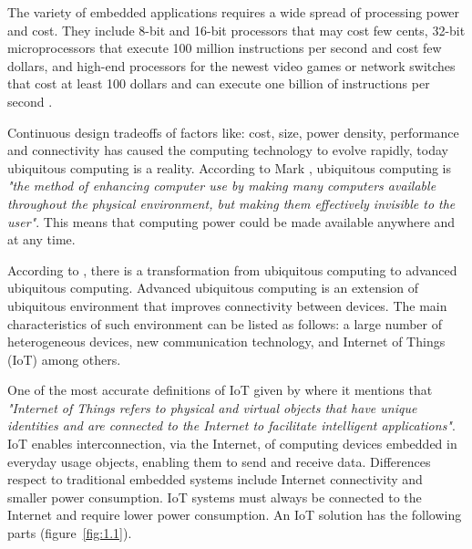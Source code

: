 The variety of embedded applications requires a wide spread of processing power
and cost. They include 8-bit and 16-bit processors that may cost few cents,
32-bit microprocessors that execute 100 million instructions per second and
cost few dollars, and high-end processors for the newest video games
or network switches that cost at least 100 dollars and can execute one billion
of instructions per second \cite{Hennessy}.

Continuous design tradeoffs of factors like: cost, size, power density,
performance and connectivity has caused the computing technology to evolve
rapidly, today ubiquitous computing is a reality. According to Mark
\cite{Mark}, ubiquitous computing is \textit{"the method of enhancing computer
use by making many computers available throughout the physical environment, but
making them effectively invisible to the user"}. This means that computing
power could be made available anywhere and at any time. 


According to \cite{Nur}, there is a transformation from ubiquitous computing to
advanced ubiquitous computing. Advanced ubiquitous computing is an extension of
ubiquitous environment that improves connectivity between devices. The main
characteristics of such environment can be listed as follows: a large number of
heterogeneous devices, new communication technology, and Internet of Things
(IoT) among others.

One of the most accurate definitions of IoT given by \cite{Bahga} where it
mentions that \textit{"Internet of Things refers to physical and virtual
objects that have unique identities and are connected to the Internet to
facilitate intelligent applications"}. IoT enables interconnection, via the
Internet, of computing devices embedded in everyday usage objects, enabling
them to send and receive data. Differences respect to traditional embedded
systems include Internet connectivity and smaller power consumption. IoT
systems must always be connected to the Internet and require lower power
consumption. An IoT solution has the following parts (figure~\ref{fig:1.1}).


